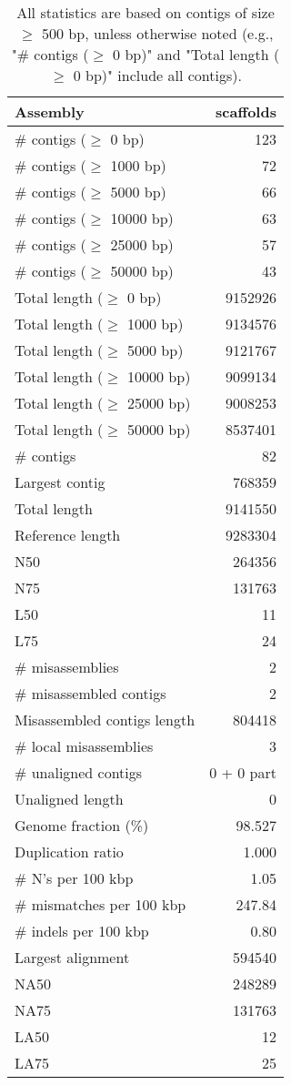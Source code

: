 \documentclass[12pt,a4paper]{article}
\begin{document}
\begin{table}[ht]
\begin{center}
\caption{All statistics are based on contigs of size $\geq$ 500 bp, unless otherwise noted (e.g., "\# contigs ($\geq$ 0 bp)" and "Total length ($\geq$ 0 bp)" include all contigs).}
\begin{tabular}{|l*{1}{|r}|}
\hline
Assembly & scaffolds \\ \hline
\# contigs ($\geq$ 0 bp) & 123 \\ \hline
\# contigs ($\geq$ 1000 bp) & 72 \\ \hline
\# contigs ($\geq$ 5000 bp) & 66 \\ \hline
\# contigs ($\geq$ 10000 bp) & 63 \\ \hline
\# contigs ($\geq$ 25000 bp) & 57 \\ \hline
\# contigs ($\geq$ 50000 bp) & 43 \\ \hline
Total length ($\geq$ 0 bp) & 9152926 \\ \hline
Total length ($\geq$ 1000 bp) & 9134576 \\ \hline
Total length ($\geq$ 5000 bp) & 9121767 \\ \hline
Total length ($\geq$ 10000 bp) & 9099134 \\ \hline
Total length ($\geq$ 25000 bp) & 9008253 \\ \hline
Total length ($\geq$ 50000 bp) & 8537401 \\ \hline
\# contigs & 82 \\ \hline
Largest contig & 768359 \\ \hline
Total length & 9141550 \\ \hline
Reference length & 9283304 \\ \hline
N50 & 264356 \\ \hline
N75 & 131763 \\ \hline
L50 & 11 \\ \hline
L75 & 24 \\ \hline
\# misassemblies & 2 \\ \hline
\# misassembled contigs & 2 \\ \hline
Misassembled contigs length & 804418 \\ \hline
\# local misassemblies & 3 \\ \hline
\# unaligned contigs & 0 + 0 part \\ \hline
Unaligned length & 0 \\ \hline
Genome fraction (\%) & 98.527 \\ \hline
Duplication ratio & 1.000 \\ \hline
\# N's per 100 kbp & 1.05 \\ \hline
\# mismatches per 100 kbp & 247.84 \\ \hline
\# indels per 100 kbp & 0.80 \\ \hline
Largest alignment & 594540 \\ \hline
NA50 & 248289 \\ \hline
NA75 & 131763 \\ \hline
LA50 & 12 \\ \hline
LA75 & 25 \\ \hline
\end{tabular}
\end{center}
\end{table}
\end{document}
